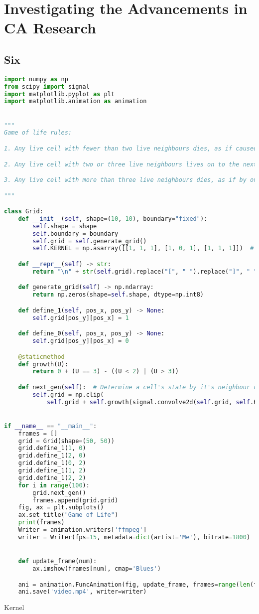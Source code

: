 \chapter{Investigating the Advancements in CA Research}
\section{Six}
\begin{lstlisting}[language=python, caption=Initial CA Engine]
import numpy as np
from scipy import signal
import matplotlib.pyplot as plt
import matplotlib.animation as animation


"""
Game of life rules:

1. Any live cell with fewer than two live neighbours dies, as if caused by underpopulation.

2. Any live cell with two or three live neighbours lives on to the next generation.

3. Any live cell with more than three live neighbours dies, as if by overpopulation.

"""

class Grid:
    def __init__(self, shape=(10, 10), boundary="fixed"):
        self.shape = shape
        self.boundary = boundary
        self.grid = self.generate_grid()
        self.KERNEL = np.asarray([[1, 1, 1], [1, 0, 1], [1, 1, 1]])  # The KERNEL to convolve cells

    def __repr__(self) -> str:
        return "\n" + str(self.grid).replace("[", " ").replace("]", " ") + "\n"

    def generate_grid(self) -> np.ndarray:
        return np.zeros(shape=self.shape, dtype=np.int8)

    def define_1(self, pos_x, pos_y) -> None:
        self.grid[pos_y][pos_x] = 1

    def define_0(self, pos_x, pos_y) -> None:
        self.grid[pos_y][pos_x] = 0

    @staticmethod
    def growth(U):
        return 0 + (U == 3) - ((U < 2) | (U > 3))

    def next_gen(self):  # Determine a cell's state by it's neighbour count
        self.grid = np.clip(
            self.grid + self.growth(signal.convolve2d(self.grid, self.KERNEL, mode='same', boundary='wrap')), 0, 1)


if __name__ == "__main__":
    frames = []
    grid = Grid(shape=(50, 50))
    grid.define_1(1, 0)
    grid.define_1(2, 0)
    grid.define_1(0, 2)
    grid.define_1(1, 2)
    grid.define_1(2, 2)
    for i in range(100):
        grid.next_gen()
        frames.append(grid.grid)
    fig, ax = plt.subplots()
    ax.set_title("Game of Life")
    print(frames)
    Writer = animation.writers['ffmpeg']
    writer = Writer(fps=15, metadata=dict(artist='Me'), bitrate=1800)


    def update_frame(num):
        ax.imshow(frames[num], cmap='Blues')

    ani = animation.FuncAnimation(fig, update_frame, frames=range(len(frames)), repeat=True)
    ani.save('video.mp4', writer=writer)

\end{lstlisting}
\Gls{Kernel}
